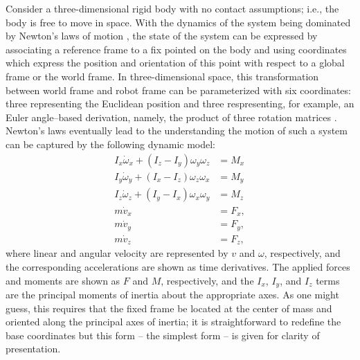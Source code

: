 Consider a three-dimensional rigid body with no contact assumptions; i.e., the body is free to move in space.
%
With the dynamics of the system being dominated by Newton's laws of motion \cite{feynman1963}, the state of the system can be expressed by associating a reference frame to a fix pointed on the body and using coordinates which express the position and orientation of this point with respect to a global frame or the world frame.
%
In three-dimensional space, this transformation between world frame and robot frame can be parameterized with six coordinates: three representing the Euclidean position and three respresenting, for example, an Euler angle--based derivation, namely, the product of three rotation matrices \cite{Baruh98}.
%
Newton's laws eventually lead to the understanding the motion of such a system can be captured by the following dynamic model:
\begin{align}
  \nonumber
  I_{x} \dot{\omega}_{x} + (I_{z} - I_{y}) \omega_{y} \omega_{z} &= M_{x}\\
  \nonumber
  I_{y} \dot{\omega}_{y} + (I_{x} - I_{z}) \omega_{z} \omega_{x} &= M_{y}\\
  \nonumber
  I_{z} \dot{\omega}_{z} + (I_{y} - I_{x}) \omega_{x} \omega_{y} &= M_{z}\\
  \nonumber
  m \dot{v}_{x} &= F_{x},\\
  \nonumber
  m \dot{v}_{y} &= F_{y},\\
  m \dot{v}_{z} &= F_{z},
\end{align}
where linear and angular velocity are represented by $v$ and $\omega$, respectively, and the corresponding accelerations are shown as time derivatives.
%
The applied forces and moments are shown as $F$ and $M$, respectively, and the $I_{x}$, $I_{y}$, and $I_{z}$ terms are the principal moments of inertia about the appropriate axes.
%
As one might guess, this requires that the fixed frame be located at the center of mass and oriented along the principal axes of inertia; it is straightforward to redefine the base coordinates but this form -- the simplest form -- is given for clarity of presentation.

